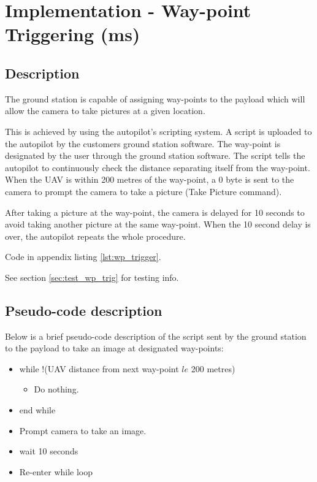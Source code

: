 
\section{Implementation - Way-point Triggering (ms)}
\label{sec:waypoint_triggering}

\subsection{Description}

The ground station is capable of assigning way-points to
the payload which will allow the camera to take pictures 
at a given location.

This is achieved by using the autopilot's scripting system.
A script is uploaded to the autopilot by the customers ground station
software. The way-point is designated by the user
through the ground station software. The script 
tells the autopilot to continuously check the
distance separating itself from the way-point.
When the UAV is within 200 metres of the
way-point, a 0 byte is sent to the camera to prompt
the camera to take a picture (Take Picture command).

After taking a picture at the way-point, the camera
is delayed for 10 seconds to avoid taking another picture
at the same way-point. When the 10 second delay is over,
the autopilot repeats the whole procedure.

Code in appendix listing \ref{lst:wp_trigger}.

See section \ref{sec:test_wp_trig} for testing info.

\subsection{Pseudo-code description}

Below is a brief pseudo-code description of the script
sent by the ground station to the payload to take an
image at designated way-points:

\begin{itemize}
	\item while !(UAV distance from next way-point $le$ 200 metres)
		\begin{itemize}
			\item Do nothing.
		\end{itemize}
	\item end while
	\item Prompt camera to take an image.
	\item wait 10 seconds
	\item Re-enter while loop
\end{itemize}


